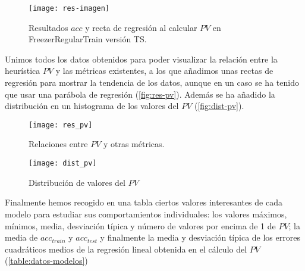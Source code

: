 \begin{figure}[htbp]
  \centering
  \hspace*{-1cm}
  \texttt{[image: res-imagen]}
  \caption{Resultados $acc$ y recta de regresión al calcular $PV$ en FreezerRegularTrain versión TS.}
  \label{fig:res-imagen}
\end{figure}

Unimos todos los datos obtenidos para poder visualizar la relación entre la heurística $PV$ y las métricas existentes, a los que añadimos unas rectas de regresión para mostrar la tendencia de los datos, aunque en un caso se ha tenido que usar una parábola de regresión (\autoref{fig:res-pv}). Además se ha añadido la distribución en un histograma de los valores del $PV$ (\autoref{fig:dist-pv}).

\begin{figure}[htbp]
  \centering
  \hspace*{-1cm}
  \texttt{[image: res\_pv]}
  \caption{Relaciones entre $PV$ y otras métricas.}
  \label{fig:res-pv}
\end{figure}

\begin{figure}[htbp]
  \centering
  \texttt{[image: dist\_pv]}
  \caption{Distribución de valores del $PV$}
  \label{fig:dist-pv}
\end{figure}

Finalmente hemos recogido en una tabla ciertos valores interesantes de cada modelo para estudiar sus comportamientos individuales: los valores máximos, mínimos, media, desviación típica y número de valores por encima de 1 de $PV$; la media de $acc_{train}$ y $acc_{test}$ y finalmente la media y desviación típica de los errores cuadráticos medios de la regresión lineal obtenida en el cálculo del $PV$ (\autoref{table:datos-modelos})

